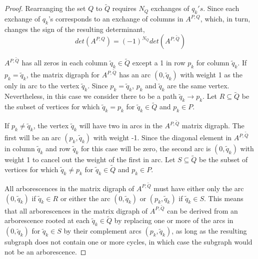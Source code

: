 \documentclass{article}
\begin{document}
\begin{proof}
Rearranging the set $Q$ to $\tilde{Q}$ requires $N_Q$
exchanges of ${q_k}'s$.
Since each exchange of $q_k$'s
corresponds to an exchange of columns in $A^{P, Q}$, which, in turn, changes
the sign of the resulting determinant,
\begin{equation}
det(A^{P, Q}) = \left(-1\right)^{N_Q} det(A^{P, \tilde{Q}})
\label{eq:detapqp}
\end{equation}

$A^{P, \tilde{Q}}$ has all zeros in each column $\tilde{q}_k \in \tilde{Q}$
except a 1 in row
$p_k$ for column $\tilde{q}_k$.
If $p_k = \tilde{q}_k$, the matrix digraph for $A^{P, \tilde{Q}}$
has an arc $(0, \tilde{q}_k)$ with weight 1 as the only in arc
to the vertex $\tilde{q}_k$.  Since $p_k = \tilde{q}_k$, $p_k$ and
$\tilde{q}_k$ are the same vertex.  Nevertheless, in this case we consider
there to be a path $\tilde{q}_k \to p_k$.
Let $R \subseteq \tilde{Q}$ be the subset of vertices for which
$\tilde{q}_k = p_k$ for $\tilde{q}_k \in \tilde{Q}$ and $p_k \in P$.

If $p_k \ne \tilde{q}_k$, the vertex $\tilde{q}_k$
will have two in arcs in the $A^{P, \tilde{Q}}$ matrix digraph.
The first will be an arc $(p_k, \tilde{q}_k)$ with weight -1.
Since the diagonal element in $A^{P, \tilde{Q}}$ 
in column $\tilde{q}_k$ and row $\tilde{q}_k$ for this case will be zero,
the second arc is $(0, \tilde{q}_k)$ with weight 1 to cancel out the
weight of the first in arc.
Let $S \subseteq \tilde{Q}$ be the subset of vertices for which
$\tilde{q}_k \ne p_k$ for $\tilde{q}_k \in \tilde{Q}$ and $p_k \in P$.

All arborescences in the matrix digraph of $A^{P, \tilde{Q}}$ must have
either only the arc $(0, \tilde{q}_k)$ if $\tilde{q}_k \in R$ or either
the arc $(0, \tilde{q}_k)$ or $(p_k, \tilde{q}_k)$
if $\tilde{q}_k \in S$.  This means that all arborescences
in the matrix digraph of $A^{P, \tilde{Q}}$ can be derived from an arborescence
rooted at each $\tilde{q}_k \in \tilde{Q}$ by replacing one or more
of the arcs in $(0, \tilde{q}_k)$ for $\tilde{q}_k \in S$ by their
complement arcs $(p_k, \tilde{q}_k)$, as long as the resulting subgraph
does not contain one or more cycles, in which case the subgraph would not
be an arborescence.


\end{proof}
\end{document}

